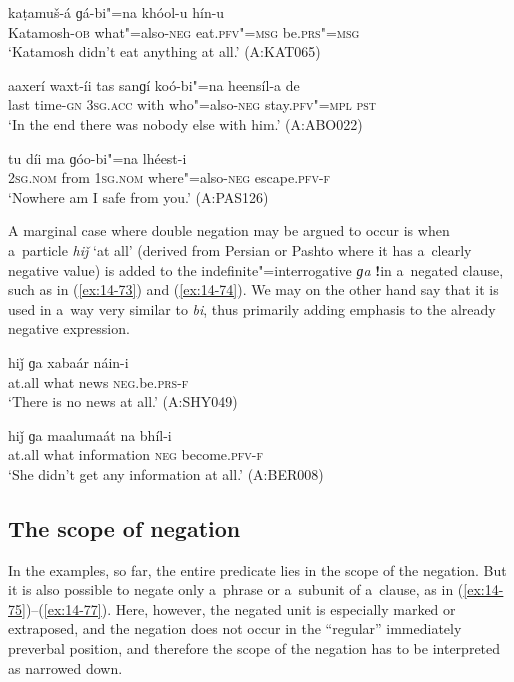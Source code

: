 \begin{exe}
\ex
\label{ex:14-70}
\gll kaṭamuš-á ɡá-bi"=na khóol-u hín-u \\
Katamosh-\textsc{ob} what"=also-\textsc{neg} eat.\textsc{pfv"=msg } be.\textsc{prs"=msg} \\
\glt `Katamosh didn't eat anything at all.' (A:KAT065)

\ex
\label{ex:14-71}
\gll aaxerí waxt-íi tas sanɡí koó-bi"=na heensíl-a  de \\
last time-\textsc{gn} \textsc{3sg.acc} with who"=also-\textsc{neg} stay.\textsc{pfv"=mpl}  \textsc{pst} \\
\glt `In the end there was nobody else with him.' (A:ABO022)

\ex
\label{ex:14-72}
\gll tu díi ma ɡóo-bi"=na lhéest-i \\
\textsc{2sg.nom} from \textsc{1sg.nom} where"=also-\textsc{neg} escape.\textsc{pfv-f}  \\
\glt `Nowhere am I safe from you.' (A:PAS126)
\end{exe}

A marginal case where double negation may be argued to occur is when a~particle \textit{hiǰ} `at all' (derived from Persian or Pashto where it has a~clearly negative value) is added to the indefinite"=interrogative \textit{ɡa} \textbf{!}in a~negated clause, such as in (\ref{ex:14-73}) and (\ref{ex:14-74}). We may on the other hand say that it is used in a~way very similar to \textit{bi}, thus primarily adding emphasis to the already negative expression.

\begin{exe}
\ex
\label{ex:14-73}
\gll hiǰ ɡa xabaár náin-i \\
at.all what news \textsc{neg}.be.\textsc{prs-f}  \\
\glt `There is no news at all.' (A:SHY049)

\ex
\label{ex:14-74}
\gll hiǰ ɡa maalumaát na bhíl-i \\
at.all what information \textsc{neg} become.\textsc{pfv-f } \\
\glt `She didn't get any information at all.' (A:BER008)
\end{exe}

\subsection{The scope of negation}
\label{subsec:14-3-3}


 In the examples, so far, the entire predicate lies in the scope of the negation. But it is also possible to negate only a~phrase or a~subunit of a~clause, as in (\ref{ex:14-75})--(\ref{ex:14-77}). Here, however, the negated unit is especially marked or extraposed, and the negation does not occur in the ``regular'' immediately preverbal position, and therefore the scope of the negation has to be interpreted as narrowed down. 

